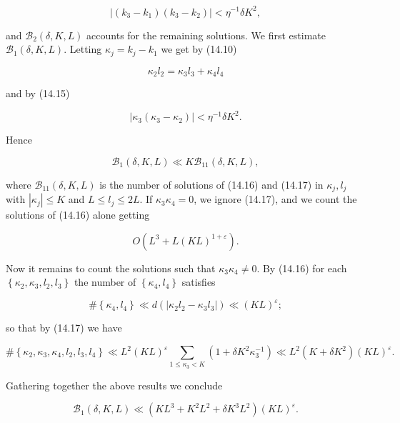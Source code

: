 \documentclass[10pt]{article}
\begin{document}
\begin{equation*}
\left|\left(k_{3}-k_{1}\right)\left(k_{3}-k_{2}\right)\right|<\eta^{-1} \delta K^{2}, \tag{14.15}
\end{equation*}


and $\mathscr{B}_{2}(\delta, K, L)$ accounts for the remaining solutions.
We first estimate $\mathscr{B}_{1}(\delta, K, L)$. Letting $\kappa_{j}=k_{j}-k_{1}$ we get by (14.10)


\begin{equation*}
\kappa_{2} l_{2}=\kappa_{3} l_{3}+\kappa_{4} l_{4} \tag{14.16}
\end{equation*}


and by (14.15)


\begin{equation*}
\left|\kappa_{3}\left(\kappa_{3}-\kappa_{2}\right)\right|<\eta^{-1} \delta K^{2} . \tag{14.17}
\end{equation*}


Hence

$$
\mathscr{B}_{1}(\delta,K,L)\ll K\mathscr{B}_{11}(\delta,K,L),
$$

where $\mathscr{B}_{11}(\delta, K, L)$ is the number of solutions of (14.16) and (14.17) in $\kappa_{j}, l_{j}$ with $\left|\kappa_{j}\right| \leqslant K$ and $L \leqslant l_{j} \leqslant 2 L$. If $\kappa_{3} \kappa_{4}=0$, we ignore (14.17), and we count the solutions of (14.16) alone getting

$$
O\left(L^{3}+L(K L)^{1+\varepsilon}\right) .
$$

Now it remains to count the solutions such that $\kappa_{3} \kappa_{4} \neq 0$. By (14.16) for each $\left\{\kappa_{2}, \kappa_{3}, l_{2}, l_{3}\right\}$ the number of $\left\{\kappa_{4}, l_{4}\right\}$ satisfies

$$
\#\left\{\kappa_{4},l_{4}\right\}\ll d\left(\left|\kappa_{2} l_{2}-\kappa_{3} l_{3}\right|\right) \ll(K L)^{\varepsilon} ;
$$

so that by (14.17) we have

$$
\#\left\{\kappa_{2},\kappa_{3},\kappa_{4},l_{2},l_{3},l_{4}\right\}
\ll L^{2}(KL)^{\varepsilon}\sum_{1\leqslant\kappa_{3}<K}
\left(1+\delta K^{2}\kappa_{3}^{-1}\right)
\ll L^{2}\left(K+\delta K^{2}\right)(KL)^{\varepsilon}.
$$

Gathering together the above results we conclude


\begin{equation*}
\mathscr{B}_{1}(\delta, K, L) \ll\left(K L^{3}+K^{2} L^{2}+\delta K^{3} L^{2}\right)(K L)^{\varepsilon} . \tag{14.18}
\end{equation*}
\end{document}
